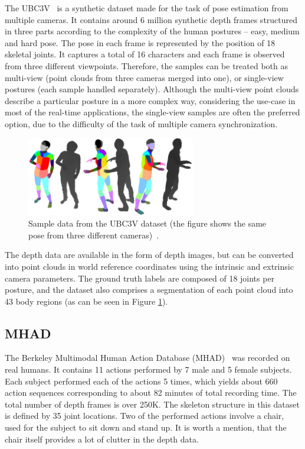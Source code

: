 The UBC3V~\cite{Shafaei16} is a synthetic dataset made for the task of pose estimation from multiple cameras. It contains around 6 million synthetic depth frames structured in three parts according to the complexity of the human postures – easy, medium and hard pose. The pose in each frame is represented by the position of 18 skeletal joints. It captures a total of 16 characters and each frame is observed from three different viewpoints. Therefore, the samples can be treated both as multi-view (point clouds from three cameras merged into one), or single-view postures (each sample handled separately). Although the multi-view point clouds describe a particular posture in a more complex way, considering the use-case in most of the real-time applications, the single-view samples are often the preferred option, due to the difficulty of the task of multiple camera synchronization.\par

\vspace{5mm}
\begin{figure}[H]
\begin{center}
  \includegraphics[height=130px]{images/implementation/ubc3v.png}
  \caption[Sample data from the UBC3V dataset.]{Sample data from the UBC3V dataset (the figure shows the same pose from three different cameras)~\cite{Shafaei16}.}
  \label{fig:ubc3v}
\end{center}
\end{figure}

\noindent
 The depth data are available in the form of depth images, but can be converted into point clouds in world reference coordinates using the intrinsic and extrinsic camera parameters. The ground truth labels are composed of 18 joints per posture, and the dataset also comprises a segmentation of each point cloud into 43 body regions (as can be seen in Figure \ref{fig:ubc3v}).

\subsection{MHAD}
The Berkeley Multimodal Human Action Database (MHAD)~\cite{Vidal:2013:BMC:2478277.2478412} was recorded on real humans. It contains 11 actions performed by 7 male and 5 female subjects. Each subject performed each of the actions 5 times, which yields about 660 action sequences corresponding to about 82 minutes of total recording time. The total number of depth frames is over 250K. The skeleton structure in this dataset is defined by 35 joint locations. Two of the performed actions involve a chair, used for the subject to sit down and stand up. It is worth a mention, that the chair itself provides a lot of clutter in the depth data.\par

